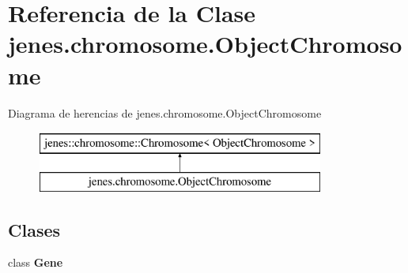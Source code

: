 \hypertarget{classjenes_1_1chromosome_1_1_object_chromosome}{\section{Referencia de la Clase jenes.\-chromosome.\-Object\-Chromosome}
\label{classjenes_1_1chromosome_1_1_object_chromosome}
}
Diagrama de herencias de jenes.\-chromosome.\-Object\-Chromosome\begin{figure}[H]
\begin{center}
\leavevmode
\includegraphics[height=2.000000cm]{classjenes_1_1chromosome_1_1_object_chromosome}
\end{center}
\end{figure}
\subsection*{Clases}
\begin{DoxyCompactItemize}
\item 
class {\bfseries Gene}
\end{DoxyCompactItemize}

